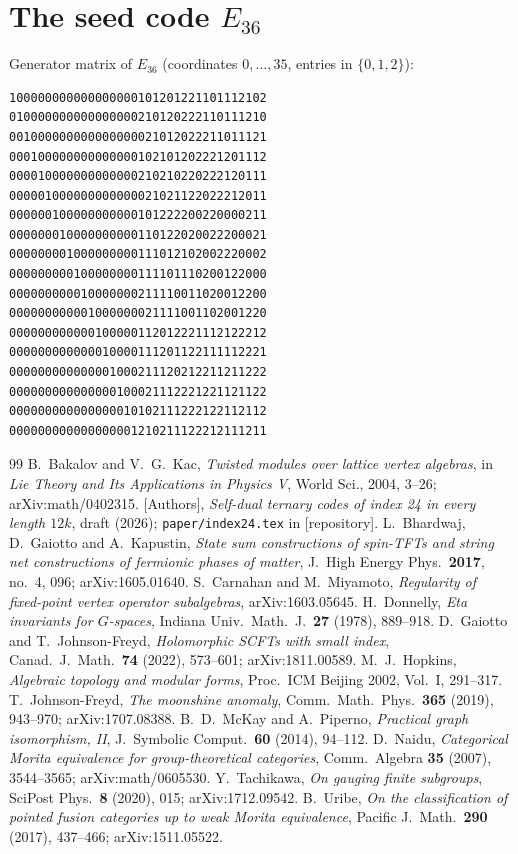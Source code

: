 \documentclass[11pt]{amsart}
\theoremstyle{definition}
\begin{document}
\section{\texorpdfstring{The seed code $E_{36}$}{The seed code E36}}\label{app:seed}
Generator matrix of $E_{36}$ (coordinates $0,\dots,35$, entries in $\{0,1,2\}$):
{\footnotesize
\begin{verbatim}
100000000000000000101201221101112102
010000000000000000210120222110111210
001000000000000000021012022211011121
000100000000000000102101202221201112
000010000000000000210210220222120111
000001000000000000021021122022212011
000000100000000000101222200220000211
000000010000000000110122020022200021
000000001000000000111012102002220002
000000000100000000111101110200122000
000000000010000000211110011020012200
000000000001000000021111001102001220
000000000000100000112012221112122212
000000000000010000111201122111112221
000000000000001000211120212211211222
000000000000000100021112221221121122
000000000000000010102111222122112112
000000000000000001210211122212111211
\end{verbatim}
}

\begin{thebibliography}{99}
B.~Bakalov and V.~G.~Kac, \emph{Twisted modules over lattice vertex algebras}, in \emph{Lie Theory and
Its Applications in Physics V}, World Sci., 2004, 3--26; arXiv:math/0402315.
[Authors], \emph{Self-dual ternary codes of index 24 in every length $12k$}, draft (2026);
\texttt{paper/index24.tex} in [repository].
L.~Bhardwaj, D.~Gaiotto and A.~Kapustin, \emph{State sum constructions of spin-TFTs and string net
constructions of fermionic phases of matter}, J.\ High Energy Phys.\ \textbf{2017}, no.~4, 096;
arXiv:1605.01640.
S.~Carnahan and M.~Miyamoto, \emph{Regularity of fixed-point vertex operator subalgebras},
arXiv:1603.05645.
H.~Donnelly, \emph{Eta invariants for $G$-spaces}, Indiana Univ.\ Math.\ J.\ \textbf{27} (1978), 889--918.
D.~Gaiotto and T.~Johnson-Freyd, \emph{Holomorphic SCFTs with small index},
Canad.\ J.\ Math.\ \textbf{74} (2022), 573--601; arXiv:1811.00589.
M.~J.~Hopkins, \emph{Algebraic topology and modular forms}, Proc.\ ICM Beijing 2002, Vol.~I, 291--317.
T.~Johnson-Freyd, \emph{The moonshine anomaly}, Comm.\ Math.\ Phys.\ \textbf{365} (2019), 943--970;
arXiv:1707.08388.
B.~D.~McKay and A.~Piperno, \emph{Practical graph isomorphism, II},
J.\ Symbolic Comput.\ \textbf{60} (2014), 94--112.
D.~Naidu, \emph{Categorical Morita equivalence for group-theoretical categories}, Comm.\ Algebra
\textbf{35} (2007), 3544--3565; arXiv:math/0605530.
Y.~Tachikawa, \emph{On gauging finite subgroups}, SciPost Phys.\ \textbf{8} (2020), 015; arXiv:1712.09542.
B.~Uribe, \emph{On the classification of pointed fusion categories up to weak Morita equivalence},
Pacific J.\ Math.\ \textbf{290} (2017), 437--466; arXiv:1511.05522.
\end{thebibliography}
\end{document}
